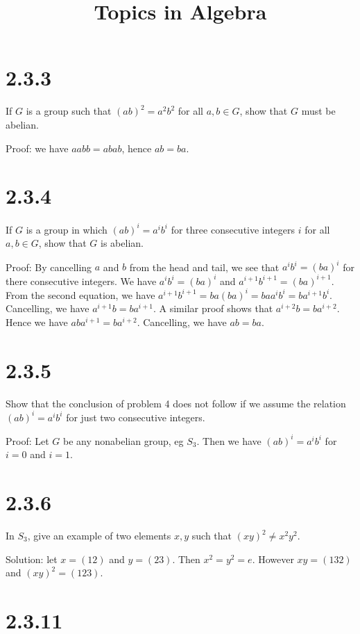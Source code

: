 \documentclass{article}
\title{Topics in Algebra}
\date{}
\begin{document}
\maketitle

\section*{2.3.3}

If $G$ is a group such that $(ab)^2 = a^2b^2$ for all $a, b \in G$, show that $G$ must be abelian.

Proof: we have $aabb = abab$, hence $ab = ba$.

\section*{2.3.4}

If $G$ is a group in which $(ab)^i = a^ib^i$ for three consecutive integers $i$ for all $a, b \in G$, show that $G$ is abelian.

Proof: By cancelling $a$ and $b$ from the head and tail, we see that $a^ib^i = (ba)^i$ for there consecutive integers. We have $a^ib^i = (ba)^i$ and $a^{i+1}b^{i+1} = (ba)^{i+1}$. From the second equation, we have $a^{i+1}b^{i+1} = ba(ba)^i = baa^ib^i= ba^{i+1}b^i$. Cancelling, we have $a^{i+1}b = ba^{i+1}$. A similar proof shows that $a^{i+2}b = ba^{i+2}$. Hence we have $aba^{i+1} = ba^{i+2}$. Cancelling, we have $ab = ba$.

\section*{2.3.5}

Show that the conclusion of problem 4 does not follow if we assume the relation $(ab)^i = a^ib^i$ for just two consecutive integers.

Proof: Let $G$ be any nonabelian group, eg $S_3$. Then we have $(ab)^i = a^ib^i$ for $i = 0$ and $i = 1$.

\section*{2.3.6}

In $S_3$, give an example of two elements $x, y$ such that $(xy)^2 \ne x^2y^2$.

Solution: let $x = (1 2)$ and $y = (2 3)$. Then $x^2 = y^2 = e$. However $xy = (1 3 2)$ and $(xy)^2 = (1 2 3)$.

\section*{2.3.11}
\end{document}
